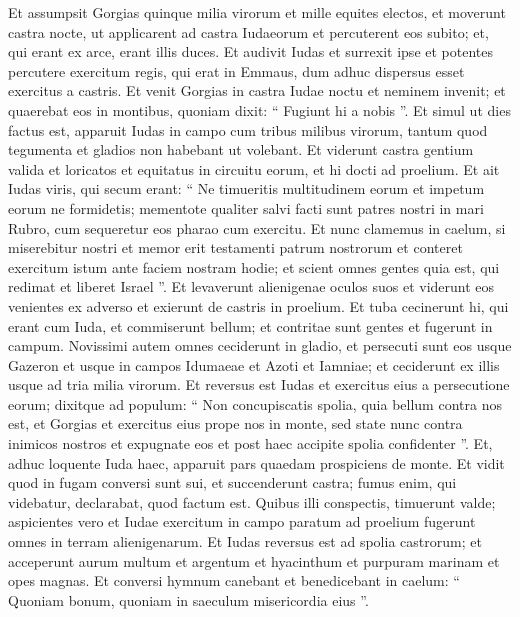 \begin{biblechapter}
\begin{biblechapter}
\begin{biblechapter}
\begin{biblechapter}
\verse Et assumpsit Gorgias quinque milia virorum et mille equites electos, et moverunt castra nocte, 
\verse ut applicarent ad castra Iudaeorum et percuterent eos subito; et, qui erant ex arce, erant illis duces. 
\verse Et audivit Iudas et surrexit ipse et potentes percutere exercitum regis, qui erat in Emmaus, 
\verse dum adhuc dispersus esset exercitus a castris. 
\verse Et venit Gorgias in castra Iudae noctu et neminem invenit; et quaerebat eos in montibus, quoniam dixit: “ Fugiunt hi a nobis ”. 
\verse Et simul ut dies factus est, apparuit Iudas in campo cum tribus milibus virorum, tantum quod tegumenta et gladios non habebant ut volebant. 
\verse Et viderunt castra gentium valida et loricatos et equitatus in circuitu eorum, et hi docti ad proelium. 
\verse Et ait Iudas viris, qui secum erant: “ Ne timueritis multitudinem eorum et impetum eorum ne formidetis; 
\verse mementote qualiter salvi facti sunt patres nostri in mari Rubro, cum sequeretur eos pharao cum exercitu. 
\verse Et nunc clamemus in caelum, si miserebitur nostri et memor erit testamenti patrum nostrorum et conteret exercitum istum ante faciem nostram hodie; 
\verse et scient omnes gentes quia est, qui redimat et liberet Israel ”.
 \verse Et levaverunt alienigenae oculos suos et viderunt eos venientes ex adverso 
 \verse et exierunt de castris in proelium. Et tuba cecinerunt hi, qui erant cum Iuda, 
\verse et commiserunt bellum; et contritae sunt gentes et fugerunt in campum. 
 \verse Novissimi autem omnes ceciderunt in gladio, et persecuti sunt eos usque Gazeron et usque in campos Idumaeae et Azoti et Iamniae; et ceciderunt ex illis usque ad tria milia virorum. 
\verse Et reversus est Iudas et exercitus eius a persecutione eorum; 
\verse dixitque ad populum: “ Non concupiscatis spolia, quia bellum contra nos est, 
\verse et Gorgias et exercitus eius prope nos in monte, sed state nunc contra inimicos nostros et expugnate eos et post haec accipite spolia confidenter ”. 
\verse Et, adhuc loquente Iuda haec, apparuit pars quaedam prospiciens de monte. 
\verse Et vidit quod in fugam conversi sunt sui, et succenderunt castra; fumus enim, qui videbatur, declarabat, quod factum est. 
 \verse Quibus illi conspectis, timuerunt valde; aspicientes vero et Iudae exercitum in campo paratum ad proelium 
\verse fugerunt omnes in terram alienigenarum. 
 \verse Et Iudas reversus est ad spolia castrorum; et acceperunt aurum multum et argentum et hyacinthum et purpuram marinam et opes magnas. 
\verse Et conversi hymnum canebant et benedicebant in caelum: “ Quoniam bonum, quoniam in saeculum misericordia eius ”. 

\end{biblechapter}
\end{biblechapter}
\end{biblechapter}
\end{biblechapter}
